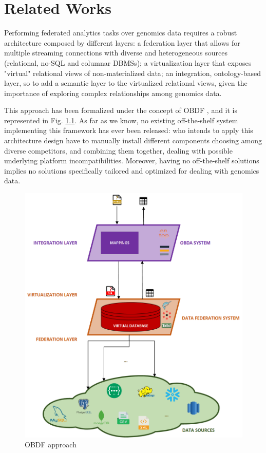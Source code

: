 
\chapter{Related Works}
\label{chp:related}

Performing federated analytics tasks over genomics data requires a robust architecture composed by different layers: a federation layer that allows for multiple streaming connections with diverse and heterogeneous sources (relational, no-SQL and columnar \ac{DBMS}s); a virtualization layer that exposes "virtual" relational views of non-materialized data; an integration, ontology-based layer, so to add a semantic layer to the virtualized relational views, given the importance of exploring complex relationships among genomics data.

This approach has been formalized under the concept of \ac{OBDF} \cite{DBLP:conf/icde/GuCPLMX24}, and it is represented in Fig. \ref{fig:obdf}. As far as we know, no existing off-the-shelf system implementing this framework has ever been released: who intends to apply this architecture design have to manually install different components choosing among diverse competitors, and combining them together, dealing with possible underlying platform incompatibilities. Moreover, having no off-the-shelf solutions implies no solutions specifically tailored and optimized for dealing with genomics data.

\begin{figure}[ht]
    \centering
    \includegraphics[width=11.5cm]{res/Drawing4.png}
    \caption{OBDF approach}
    \label{fig:obdf}
\end{figure}

